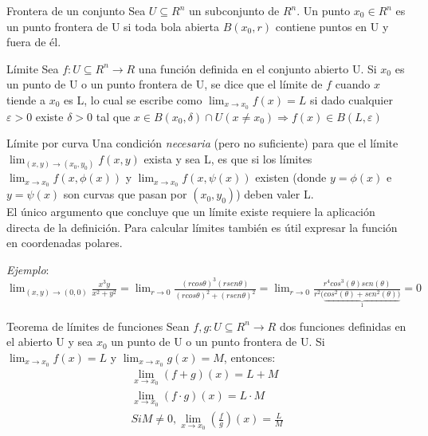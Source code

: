 \documentclass[a4paper, twoside]{article}
\numberwithin{equation}{section}
\numberwithin{figure}{section}
\numberwithin{table}{section}
\begin{document}
\begin{definicion*}{Frontera de un conjunto}
	Sea $U\subseteq R^n$ un subconjunto de $R^n$.
	Un punto $x_0\in R^n$ es un punto frontera de U si toda bola abierta $B(x_0,r)$ contiene puntos en U y fuera de él.
\end{definicion*}

\begin{definicion*}{Límite}
	Sea $f:U\subseteq R^n \rightarrow R$ una función definida en el conjunto abierto U.
	Si $x_0$ es un punto de U o un punto frontera de U, se dice que el límite de $f$ cuando $x$ tiende a $x_0$ es L, lo cual se escribe como $\lim_{x \rightarrow x_0} f \left( x \right) = L$ si dado cualquier $\varepsilon > 0$ existe $\delta > 0$ tal que $x \in B \left( x_{0}, \delta \right) \cap U \left( x \neq x_{0} \right) \Rightarrow f \left( x \right) \in B(L, \varepsilon)$
\end{definicion*}

\begin{definicion*}{Límite por curva}
	Una condición \textit{necesaria} (pero no suficiente) para que el límite $\lim_{ \left( x, y \right) \rightarrow (x_0, y_0) } f \left( x, y \right)$ exista y sea L, es que si los límites $\lim_{ x \rightarrow x_{0} } f \left( x, \phi \left(x \right) \right)$ y $\lim_{ x \rightarrow x_{0} } f \left(x, \psi \left( x \right) \right)$ existen (donde $y = \phi \left( x \right)$ e $y = \psi \left( x \right)$ son curvas que pasan por $\left( x_0, y_0 \right)$) deben valer L. \\

	El único argumento que concluye que un límite existe requiere la aplicación directa de la definición. Para calcular límites también es útil expresar la función en coordenadas polares. \\
	
	\begin{center}
		\textit{Ejemplo}: $\lim_{ \left( x, y \right) \rightarrow (0,0) } \frac{x^{3} y}{x^{2} + y^{2} } = \lim_{ r \rightarrow 0 } \frac{(rcos\theta)^{3} (rsen\theta)}{(rcos\theta)^{2} + (rsen\theta)^{2}} = \lim_{ r \rightarrow 0 } \frac{r^4cos^3(\theta)sen(\theta)}{r^2(\underbrace{ cos^2(\theta) + sen^2(\theta)) }_1} = 0$\\
	\end{center}
\end{definicion*}

\begin{teorema*}{Teorema de límites de funciones}
	Sean $f, g: U \subseteq R^n \rightarrow R$ dos funciones definidas en el abierto U y sea $x_0$ un punto de U o un punto frontera de U.
	Si $\lim_{ x \rightarrow x_0 } f \left( x \right) = L$ y $\lim_{ x \rightarrow x_0 } g \left( x \right) = M$, entonces:
	\begin{align}
		\lim_{x\rightarrow x_{0}}\left(f+g\right)\left(x\right)=L+M \\
		\lim_{x\rightarrow x_{0}}\left(f\cdot g\right)\left(x\right)=L\cdot M \\
		Si M\neq0,\lim_{x\rightarrow x_{0}}\left(\frac{f}{g}\right)\left(x\right)=\frac{L}{M}
	\end{align}
\end{teorema*}
\end{document}

